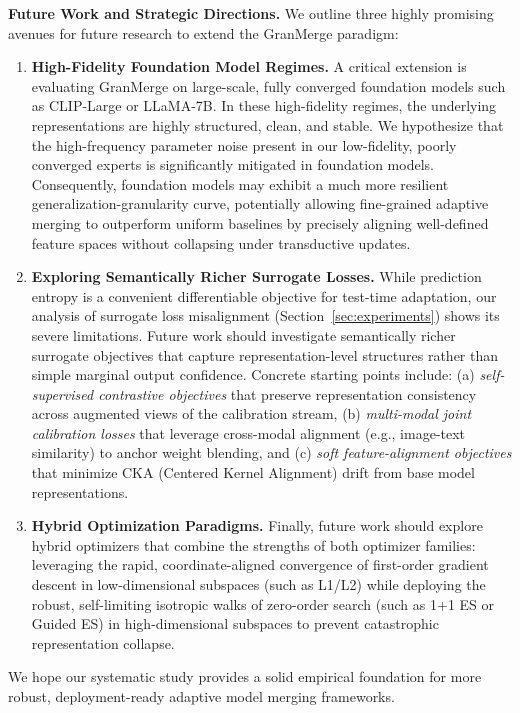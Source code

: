 \textbf{Future Work and Strategic Directions.} 
We outline three highly promising avenues for future research to extend the GranMerge paradigm:
\begin{enumerate}
    \item \textbf{High-Fidelity Foundation Model Regimes.} A critical extension is evaluating GranMerge on large-scale, fully converged foundation models such as CLIP-Large or LLaMA-7B. In these high-fidelity regimes, the underlying representations are highly structured, clean, and stable. We hypothesize that the high-frequency parameter noise present in our low-fidelity, poorly converged experts is significantly mitigated in foundation models. Consequently, foundation models may exhibit a much more resilient generalization-granularity curve, potentially allowing fine-grained adaptive merging to outperform uniform baselines by precisely aligning well-defined feature spaces without collapsing under transductive updates.
    \item \textbf{Exploring Semantically Richer Surrogate Losses.} While prediction entropy is a convenient differentiable objective for test-time adaptation, our analysis of surrogate loss misalignment (Section~\ref{sec:experiments}) shows its severe limitations. Future work should investigate semantically richer surrogate objectives that capture representation-level structures rather than simple marginal output confidence. Concrete starting points include: (a) \emph{self-supervised contrastive objectives} that preserve representation consistency across augmented views of the calibration stream, (b) \emph{multi-modal joint calibration losses} that leverage cross-modal alignment (e.g., image-text similarity) to anchor weight blending, and (c) \emph{soft feature-alignment objectives} that minimize CKA (Centered Kernel Alignment) drift from base model representations.
    \item \textbf{Hybrid Optimization Paradigms.} Finally, future work should explore hybrid optimizers that combine the strengths of both optimizer families: leveraging the rapid, coordinate-aligned convergence of first-order gradient descent in low-dimensional subspaces (such as L1/L2) while deploying the robust, self-limiting isotropic walks of zero-order search (such as 1+1 ES or Guided ES) in high-dimensional subspaces to prevent catastrophic representation collapse.
\end{enumerate}
We hope our systematic study provides a solid empirical foundation for more robust, deployment-ready adaptive model merging frameworks.
